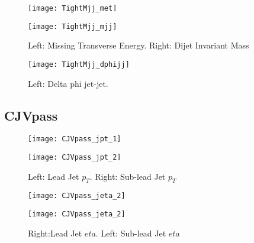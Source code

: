 \documentclass[a4paper,10pt]{article}
\begin{document}
\begin{figure}[!h]
\centering
\begin{minipage}[!h]{0.4\linewidth}
\centering
\texttt{[image: TightMjj\_met]}
\end{minipage}%
\begin{minipage}[!h]{0.4\linewidth}
\centering
\texttt{[image: TightMjj\_mjj]}
\end{minipage}
\caption{Left: Missing Transverse Energy. Right: Dijet Invariant Mass}
\end{figure}

\begin{figure}[!h]
\centering
\begin{minipage}[!h]{0.4\linewidth}
\centering
\texttt{[image: TightMjj\_dphijj]}
\end{minipage}%
\begin{minipage}[!h]{0.4\linewidth}
\centering
\end{minipage}
\caption{Left: Delta phi jet-jet.}
\end{figure}

\clearpage
\subsection{CJVpass}
  
\begin{figure}[!h]
\centering
\begin{minipage}[!h]{0.4\linewidth}
\centering
\texttt{[image: CJVpass\_jpt\_1]}
\end{minipage}%
\begin{minipage}[!h]{0.4\linewidth}
  \texttt{[image: CJVpass\_jpt\_2]}
\end{minipage}
\caption{Left: Lead Jet $p_T$. Right: Sub-lead Jet $p_T$}
\end{figure}

\begin{figure}[!h]
\centering
\begin{minipage}[!h]{0.4\linewidth}
\centering
\texttt{[image: CJVpass\_jeta\_2]}
\end{minipage}%
\begin{minipage}[!h]{0.4\linewidth}
\centering
\texttt{[image: CJVpass\_jeta\_2]}
\end{minipage}
\caption{Right:Lead Jet $eta$. Left: Sub-lead Jet $eta$}
\end{figure}
\end{document}
